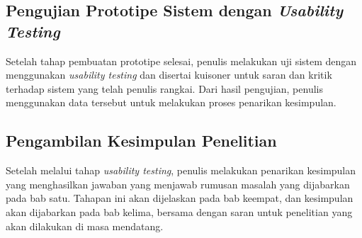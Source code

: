 	\subsection{Pengujian Prototipe Sistem dengan \textit{Usability Testing}}
	
	Setelah tahap pembuatan prototipe selesai, penulis melakukan uji sistem dengan menggunakan \textit{usability testing} dan disertai kuisoner untuk saran dan kritik terhadap sistem yang telah penulis rangkai. Dari hasil pengujian, penulis menggunakan data tersebut untuk melakukan proses penarikan kesimpulan.
	
	\subsection{Pengambilan Kesimpulan Penelitian}
	
	Setelah melalui tahap \textit{usability testing}, penulis melakukan penarikan kesimpulan yang menghasilkan jawaban yang menjawab rumusan masalah yang dijabarkan pada bab satu. Tahapan ini akan dijelaskan pada bab keempat, dan kesimpulan akan dijabarkan pada bab kelima, bersama dengan saran untuk penelitian yang akan dilakukan di masa mendatang.
	

